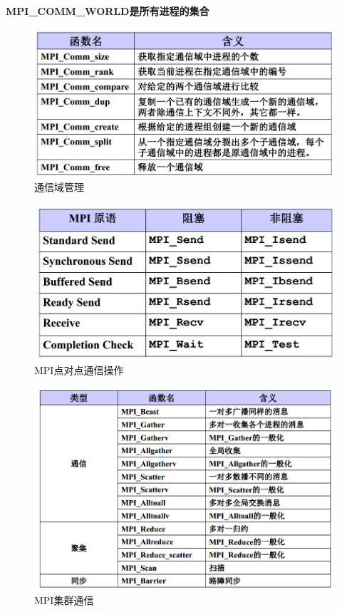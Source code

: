 \documentclass[UTF8,a4paper]{ctexart}
\begin{document}
 \textbf{MPI\_COMM\_WORLD是所有进程的集合}

 \begin{figure}[H]
   \centering
   \includegraphics[scale = 0.3]{assets/ParallelComputing_c7852.png}
   \caption{通信域管理}
 \end{figure}

 \begin{figure}[H]
   \centering
   \includegraphics[scale = 0.3]{assets/ParallelComputing_3146d.png}
   \caption{MPI点对点通信操作}
 \end{figure}

\begin{figure}[H]
  \centering
  \includegraphics[scale = 0.3]{assets/ParallelComputing_f091f.png}
  \caption{MPI集群通信}
\end{figure}
\end{document}
